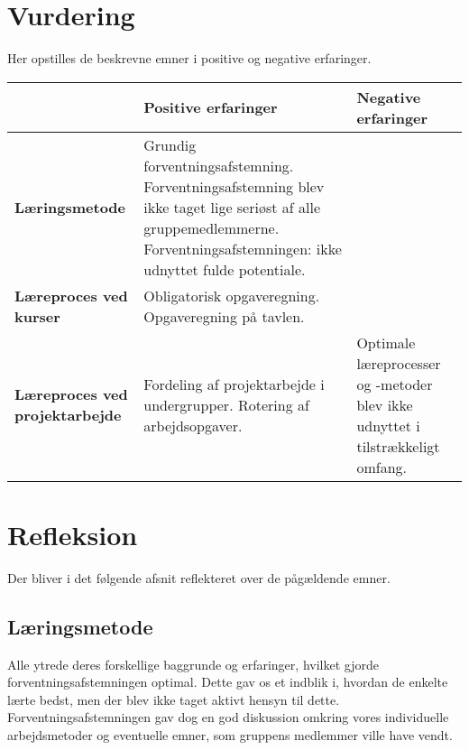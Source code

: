  
\section{Vurdering}
Her opstilles de beskrevne emner i positive og negative erfaringer.
\begin{table}[h]
	\begin{tabular}{|p{3cm}|p{5cm}|p{5cm}|}
		\hline
		&\textbf{Positive erfaringer}&\textbf{Negative erfaringer}\\ \hline
	\textbf{Læringsmetode}	& Grundig forventningsafstemning. \newline Forventningsafstemning blev ikke taget lige seriøst af alle gruppemedlemmerne. \newline Forventningsafstemningen: ikke udnyttet fulde potentiale. \\ \hline
	\textbf{Læreproces ved kurser} & Obligatorisk opgaveregning. \newline  Opgaveregning på tavlen. & \\ \hline
	\textbf{Læreproces ved projektarbejde} & Fordeling af projektarbejde i undergrupper. \newline Rotering af arbejdsopgaver. & Optimale læreprocesser og -metoder blev ikke udnyttet i tilstrækkeligt omfang.\\ \hline
		
	\end{tabular}
\end{table}

\section{Refleksion}
Der bliver i det følgende afsnit reflekteret over de pågældende emner.

\subsection{Læringsmetode}
Alle ytrede deres forskellige baggrunde og erfaringer, hvilket gjorde forventningsafstemningen optimal. Dette gav os et indblik i, hvordan de enkelte lærte bedst, men der blev ikke taget aktivt hensyn til dette. Forventningsafstemningen gav dog en god diskussion omkring vores individuelle arbejdsmetoder og eventuelle emner, som gruppens medlemmer ville have vendt.

